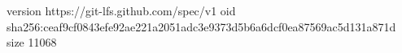 version https://git-lfs.github.com/spec/v1
oid sha256:ceaf9cf0843efe92ae221a2051adc3e9373d5b6a6dcf0ea87569ac5d131a871d
size 11068
